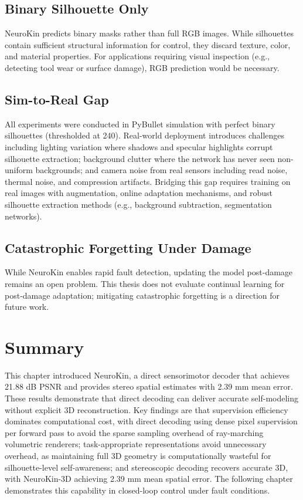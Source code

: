 \documentclass[12pt,a4paper,oneside]{report}
\begin{document}
\subsection{Binary Silhouette Only}
\label{subsec:binary_silhouette_only}

NeuroKin predicts binary masks rather than full RGB images. While silhouettes contain sufficient structural information for control, they discard texture, color, and material properties. For applications requiring visual inspection (e.g., detecting tool wear or surface damage), RGB prediction would be necessary.

\subsection{Sim-to-Real Gap}
\label{subsec:sim_to_real_gap}

All experiments were conducted in PyBullet simulation with perfect binary silhouettes (thresholded at 240). Real-world deployment introduces challenges including lighting variation where shadows and specular highlights corrupt silhouette extraction; background clutter where the network has never seen non-uniform backgrounds; and camera noise from real sensors including read noise, thermal noise, and compression artifacts. Bridging this gap requires training on real images with augmentation, online adaptation mechanisms, and robust silhouette extraction methods (e.g., background subtraction, segmentation networks).

\subsection{Catastrophic Forgetting Under Damage}
\label{subsec:catastrophic_forgetting_under_damage}

While NeuroKin enables rapid fault detection, updating the model post-damage remains an open problem. This thesis does not evaluate continual learning for post-damage adaptation; mitigating catastrophic forgetting is a direction for future work.

\section{Summary}

This chapter introduced NeuroKin, a direct sensorimotor decoder that achieves 21.88 dB PSNR and provides stereo spatial estimates with 2.39 mm mean error. These results demonstrate that direct decoding can deliver accurate self-modeling without explicit 3D reconstruction. Key findings are that supervision efficiency dominates computational cost, with direct decoding using dense pixel supervision per forward pass to avoid the sparse sampling overhead of ray-marching volumetric renderers; task-appropriate representations avoid unnecessary overhead, as maintaining full 3D geometry is computationally wasteful for silhouette-level self-awareness; and stereoscopic decoding recovers accurate 3D, with NeuroKin-3D achieving 2.39 mm mean spatial error. The following chapter demonstrates this capability in closed-loop control under fault conditions.
\end{document}
